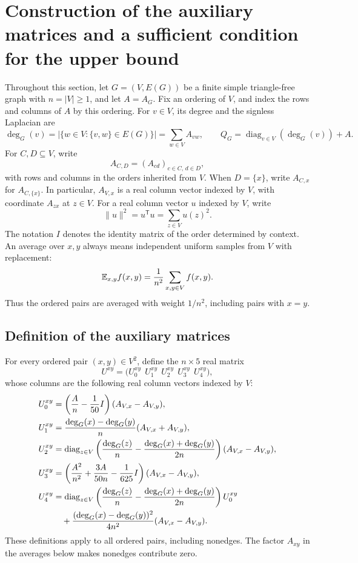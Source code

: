 \section{Construction of the auxiliary matrices and a sufficient condition for the upper bound}
\label{sec:auxiliary-matrices}
\label{sec:preliminary}

Throughout this section, let $G=(V,E(G))$ be a finite simple triangle-free
graph with $n=|V|\geq1$, and let $A=A_G$.
Fix an ordering of $V$, and index the rows and columns of $A$ by this
ordering.
For $v\in V$, its degree and the signless Laplacian are
\[
\deg_G(v)=\big|\{w\in V:\{v,w\}\in E(G)\}\big|
=\sum_{w\in V}A_{vw},
\qquad
Q_G=\operatorname{diag}_{v\in V}(\deg_G(v))+A.
\]
For $C,D\subseteq V$, write
\[
A_{C,D}=(A_{cd})_{c\in C,\,d\in D},
\]
with rows and columns in the orders inherited from $V$.
When $D=\{x\}$, write $A_{C,x}$ for $A_{C,\{x\}}$.
In particular, $A_{V,x}$ is a real column vector indexed by $V$, with
coordinate $A_{zx}$ at $z\in V$.
For a real column vector $u$ indexed by $V$, write
\[
\|u\|^2=u^{\mathsf T}u=\sum_{z\in V}u(z)^2.
\]
The notation $I$ denotes the identity matrix of the order determined
by context.
An average over $x,y$ always means independent uniform samples from $V$
with replacement:
\[
\mathbb E_{x,y}f(x,y)=\frac1{n^2}\sum_{x,y\in V}f(x,y).
\]
Thus the ordered pairs are averaged with weight $1/n^2$, including
pairs with $x=y$.

\subsection{Definition of the auxiliary matrices}
\label{subsec:auxiliary-definitions}

For every ordered pair $(x,y)\in V^2$, define the $n\times5$ real matrix
\begin{equation}\label{eq:new-U-matrix}
U^{xy}=\big(U_0^{xy}\ \ U_1^{xy}\ \ U_2^{xy}\ \ U_3^{xy}\ \ U_4^{xy}\big),
\end{equation}
whose columns are the following real column vectors indexed by $V$:
\begin{align}
U_0^{xy}
&=\left(\frac An-\frac1{50}I\right)
   (A_{V,x}-A_{V,y}),
\label{eq:new-U0}\\
U_1^{xy}
&=\frac{\deg_G(x)-\deg_G(y)}n
   (A_{V,x}+A_{V,y}),
\label{eq:new-U1}\\
U_2^{xy}
&=\operatorname{diag}_{z\in V}\left(
   \frac{\deg_G(z)}n-\frac{\deg_G(x)+\deg_G(y)}{2n}\right)
   (A_{V,x}-A_{V,y}),
\label{eq:new-U2}\\
U_3^{xy}
&=\left(\frac{A^2}{n^2}+\frac{3A}{50n}-\frac1{625}I\right)
   (A_{V,x}-A_{V,y}),
\label{eq:new-U3}\\
U_4^{xy}
&=\operatorname{diag}_{z\in V}\left(
   \frac{\deg_G(z)}n-\frac{\deg_G(x)+\deg_G(y)}{2n}\right)U_0^{xy}
   \notag\\
&\quad+\frac{(\deg_G(x)-\deg_G(y))^2}{4n^2}
   (A_{V,x}-A_{V,y}).
\label{eq:new-U4}
\end{align}
These definitions apply to all ordered pairs, including nonedges.
The factor $A_{xy}$ in the averages below makes nonedges contribute zero.

